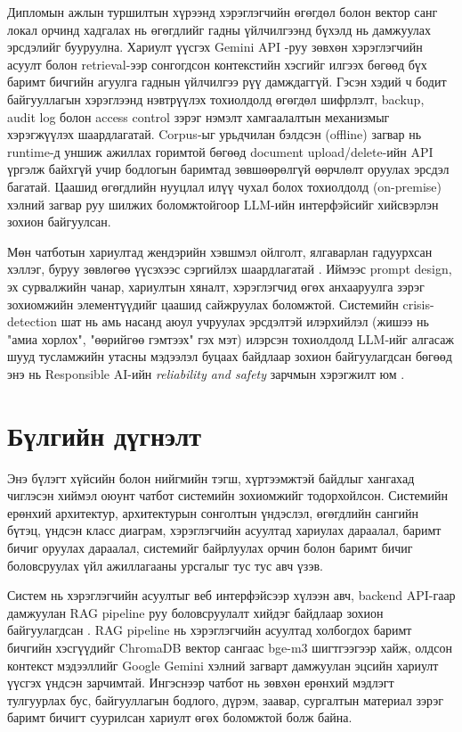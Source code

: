 Дипломын ажлын туршилтын хүрээнд хэрэглэгчийн өгөгдөл болон вектор санг локал орчинд хадгалах нь өгөгдлийг гадны үйлчилгээнд бүхэлд нь дамжуулах эрсдэлийг бууруулна. Хариулт үүсгэх Gemini API \cite{gemini_api}-руу зөвхөн хэрэглэгчийн асуулт болон retrieval-ээр сонгогдсон контекстийн хэсгийг илгээх бөгөөд бүх баримт бичгийн агуулга гаднын үйлчилгээ рүү дамждаггүй. Гэсэн хэдий ч бодит байгууллагын хэрэглээнд нэвтрүүлэх тохиолдолд өгөгдөл шифрлэлт, backup, audit log болон access control зэрэг нэмэлт хамгаалалтын механизмыг хэрэгжүүлэх шаардлагатай. Corpus-ыг урьдчилан бэлдсэн (offline) загвар нь runtime-д уншиж ажиллах горимтой бөгөөд document upload/delete-ийн API үргэлж байхгүй учир бодлогын баримтад зөвшөөрөлгүй өөрчлөлт оруулах эрсдэл багатай. Цаашид өгөгдлийн нууцлал илүү чухал болох тохиолдолд  (on-premise) хэлний загвар руу шилжих боломжтойгоор LLM-ийн интерфэйсийг хийсвэрлэн зохион байгуулсан.

Мөн чатботын хариултад жендэрийн хэвшмэл ойлголт, ялгаварлан гадуурхсан хэллэг, буруу зөвлөгөө үүсэхээс сэргийлэх шаардлагатай \cite{llm_limitations, hallucination_survey}. Иймээс prompt design, эх сурвалжийн чанар, хариултын хяналт, хэрэглэгчид өгөх анхааруулга зэрэг зохиомжийн элементүүдийг цаашид сайжруулах боломжтой. Системийн crisis-detection шат нь амь насанд аюул учруулах эрсдэлтэй илэрхийлэл (жишээ нь "амиа хорлох", "өөрийгөө гэмтээх" гэх мэт) илэрсэн тохиолдолд LLM-ийг алгасаж шууд тусламжийн утасны мэдээлэл буцаах байдлаар зохион байгуулагдсан бөгөөд энэ нь Responsible AI-ийн \textit{reliability and safety} зарчмын хэрэгжилт юм \cite{responsible_ai}.

\section{Бүлгийн дүгнэлт}

Энэ бүлэгт хүйсийн болон нийгмийн тэгш, хүртээмжтэй байдлыг хангахад чиглэсэн хиймэл оюунт чатбот системийн зохиомжийг тодорхойлсон. Системийн ерөнхий архитектур, архитектурын сонголтын үндэслэл, өгөгдлийн сангийн бүтэц, үндсэн класс диаграм, хэрэглэгчийн асуултад хариулах дараалал, баримт бичиг оруулах дараалал, системийг байрлуулах орчин болон баримт бичиг боловсруулах үйл ажиллагааны урсгалыг тус тус авч үзэв.

Систем нь хэрэглэгчийн асуултыг веб интерфэйсээр хүлээн авч, backend API-гаар дамжуулан RAG pipeline руу боловсруулалт хийдэг байдлаар зохион байгуулагдсан \cite{rag_survey}. RAG pipeline нь хэрэглэгчийн асуултад холбогдох баримт бичгийн хэсгүүдийг ChromaDB вектор сангаас \cite{chromadb} bge-m3 шигтгээгээр \cite{bge_m3} хайж, олдсон контекст мэдээллийг Google Gemini хэлний загварт \cite{gemini_report} дамжуулан эцсийн хариулт үүсгэх үндсэн зарчимтай. Ингэснээр чатбот нь зөвхөн ерөнхий мэдлэгт тулгуурлах бус, байгууллагын бодлого, дүрэм, заавар, сургалтын материал зэрэг баримт бичигт суурилсан хариулт өгөх боломжтой болж байна.

